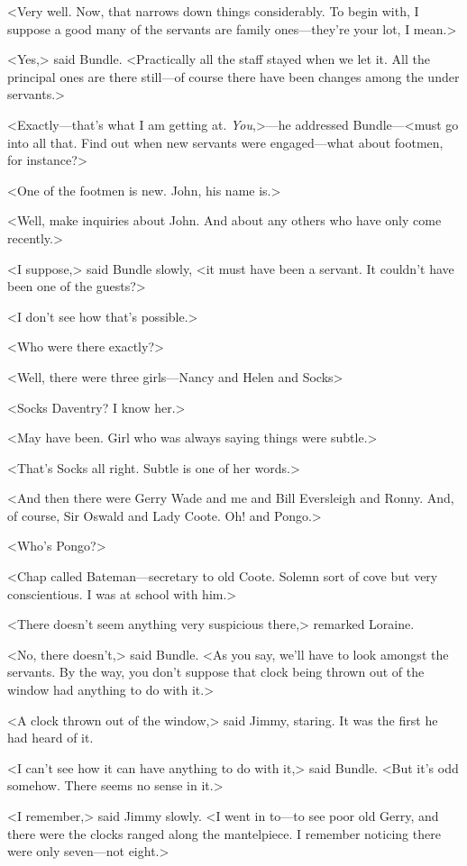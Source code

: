<Very well. Now, that narrows down things considerably. To begin with, I suppose a good many of the servants are family ones—they're your lot, I mean.>

<Yes,> said Bundle. <Practically all the staff stayed when we let it. All the principal ones are there still—of course there have been changes among the under servants.>

<Exactly—that's what I am getting at. \emph{You},>—he addressed Bundle—<must go into all that. Find out when new servants were engaged—what about footmen, for instance?>

<One of the footmen is new. John, his name is.>

<Well, make inquiries about John. And about any others who have only come recently.>

<I suppose,> said Bundle slowly, <it must have been a servant. It couldn't have been one of the guests?>

<I don't see how that's possible.>

<Who were there exactly?>

<Well, there were three girls—Nancy and Helen and Socks\longdash>

<Socks Daventry? I know her.>

<May have been. Girl who was always saying things were subtle.>

<That's Socks all right. Subtle is one of her words.>

<And then there were Gerry Wade and me and Bill Eversleigh and Ronny. And, of course, Sir Oswald and Lady Coote. Oh! and Pongo.>

<Who's Pongo?>

<Chap called Bateman—secretary to old Coote. Solemn sort of cove but very conscientious. I was at school with him.>

<There doesn't seem anything very suspicious there,> remarked Loraine.

<No, there doesn't,> said Bundle. <As you say, we'll have to look amongst the servants. By the way, you don't suppose that clock being thrown out of the window had anything to do with it.>

<A clock thrown out of the window,> said Jimmy, staring. It was the first he had heard of it.

<I can't see how it can have anything to do with it,> said Bundle. <But it's odd somehow. There seems no sense in it.>

<I remember,> said Jimmy slowly. <I went in to—to see poor old Gerry, and there were the clocks ranged along the mantelpiece. I remember noticing there were only seven—not eight.>

